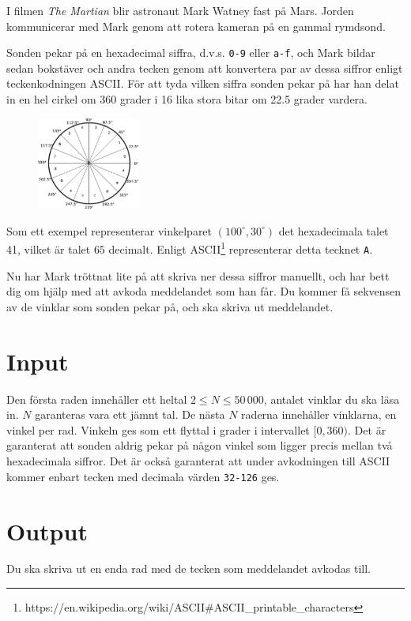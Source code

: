 I filmen \emph{The Martian} blir astronaut Mark Watney fast på Mars. Jorden kommunicerar med Mark genom att rotera
kameran på en gammal rymdsond.

Sonden pekar på en hexadecimal siffra, d.v.s. \texttt{0-9} eller \texttt{a-f}, och Mark bildar sedan bokstäver
och andra tecken genom att konvertera par av dessa siffror enligt teckenkodningen ASCII. För att tyda
vilken siffra sonden pekar på har han delat in en hel cirkel om 360 grader i 16 lika stora bitar om 22.5 grader
vardera.

\begin{figure}[h!]
  \begin{center}
    \includegraphics[width=0.3\textwidth]{angles.png}
  \end{center}
\end{figure}

Som ett exempel representerar vinkelparet $(100^{\circ}, 30^{\circ})$ det hexadecimala talet 41, vilket är talet $65$ decimalt.
Enligt ASCII\footnote{https://en.wikipedia.org/wiki/ASCII\#ASCII\_printable\_characters} representerar detta tecknet \texttt{A}.

Nu har Mark tröttnat lite på att skriva ner dessa siffror manuellt, och har bett dig om hjälp med att avkoda meddelandet
som han får. Du kommer få sekvensen av de vinklar som sonden pekar på, och ska skriva ut meddelandet.

\section*{Input}
Den första raden innehåller ett heltal $2 \le N \le 50\,000$, antalet vinklar du ska läsa in. $N$ garanteras vara ett jämnt tal.
De nästa $N$ raderna innehåller vinklarna, en vinkel per rad. Vinkeln ges som ett flyttal i grader i intervallet $[0, 360)$.
Det är garanterat att sonden aldrig pekar på någon vinkel som ligger precis mellan två hexadecimala siffror.
Det är också garanterat att under avkodningen till ASCII kommer enbart tecken med decimala värden \texttt{32-126} ges.

\section*{Output}
Du ska skriva ut en enda rad med de tecken som meddelandet avkodas till.

